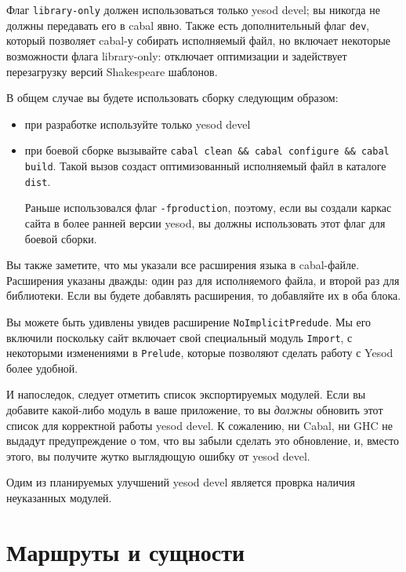 Флаг \lstinline!library-only! должен использоваться только yesod devel; вы никогда не должны
передавать его в cabal явно. Также есть дополнительный флаг \lstinline!dev!, который позволяет
cabal-у собирать исполняемый файл, но включает некоторые возможности флага library-only:
отключает оптимизации и задействует перезагрузку версий Shakespeare шаблонов.

В общем случае вы будете использовать сборку следующим образом:
\begin{itemize}
    \item при разработке используйте только yesod devel
    \item при боевой сборке вызывайте \lstinline!cabal clean && cabal configure && cabal build!. Такой вызов
        создаст оптимизованный исполняемый файл в каталоге \lstinline!dist!.
        \begin{remark}
        Раньше использовался флаг \lstinline!-fproduction!, поэтому, если вы создали каркас сайта в более ранней
        версии yesod, вы должны использовать этот флаг для боевой сборки.
        \end{remark}
\end{itemize}

Вы также заметите, что мы указали все расширения языка в cabal-файле. Расширения указаны дважды:
один раз для исполняемого файла, и второй раз для библиотеки. Если вы будете добавлять расширения, то
добавляйте их в оба блока.

Вы можете быть удивлены увидев расширение \lstinline!NoImplicitPredude!. Мы его включили поскольку сайт 
включает свой специальный модуль \lstinline!Import!, с некоторыми изменениями в \lstinline!Prelude!, которые
позволяют сделать работу с Yesod более удобной.

И напоследок, следует отметить список экспортируемых модулей. Если вы добавите какой-либо модуль в 
ваше приложение, то вы \emph{должны} обновить этот список для корректной работы yesod devel. К сожалению,
ни Cabal, ни GHC не выдадут предупреждение о том, что вы забыли сделать это обновление, и, вместо этого,
вы получите жутко выглядющую ошибку от yesod devel.
\begin{remark}
Одим из планируемых улучшений yesod devel является проврка наличия неуказанных модулей.
\end{remark}

\section{Маршруты и сущности}

